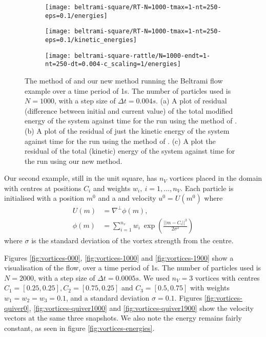 \documentclass[11pt, oneside]{article}   	%
\newcommand{\dt}{\Delta t}
\begin{document}
\begin{figure}[H]
   \begin{subfigure}[t]{0.4\textwidth}
        \centering
	\texttt{[image: beltrami-square/RT-N=1000-tmax=1-nt=250-eps=0.1/energies]}
        \caption{} \label{fig:beltrami-flow-energies-q}
    \end{subfigure}
    \begin{subfigure}[t]{0.4\textwidth}
        \centering
	\texttt{[image: beltrami-square/RT-N=1000-tmax=1-nt=250-eps=0.1/kinetic\_energies]}
        \caption{} \label{fig:beltrami-flow-energies-q-ke}
    \end{subfigure}
   \begin{subfigure}[t]{0.4\textwidth}
        \centering
	\texttt{[image: beltrami-square-rattle/N=1000-endt=1-nt=250-dt=0.004-c\_scaling=1/energies]}
        \caption{} \label{fig:beltrami-flow-energies}
    \end{subfigure}
\centering
\caption{The method of \cite{gallouet2016lagrangian} and our new method running the Beltrami flow example over a time period of 1s. The number of particles used is \(N = 1000\), with a step size of \(\dt = 0.004s\). (a) A plot of residual (difference between initial and current value) of the total modified energy of the system against time for the run using the method of \cite{gallouet2016lagrangian}. (b) A plot of the residual of just the kinetic energy of the system against time for the run using the method of \cite{gallouet2016lagrangian}. (c) A plot the residual of the total (kinetic) energy of the system against time for the run using our new method.}
\centering
\label{fig:beltrami-flow-energy}
\end{figure}
 
Our second example, still in the unit square, has \(n_V\) vortices placed in the domain with centres at positions \(C_i\) and weights \(w_i, \: i = 1,\dots,n_V\). Each particle is initialised with a position \(m^0\) and a and velocity \(u^0 = U(m^0)\) where
\begin{align}
U(m) &= \nabla^\perp \phi(m), \\
\phi(m) &= \sum_{i=1}^{n_v} w_i \: \exp(\frac{|| m - C_i ||^2}{2 \sigma^2})
\end{align}
where \(\sigma\) is the standard deviation of the vortex strength from the centre.

Figures \ref{fig:vortices-000}, \ref{fig:vortices-1000} and \ref{fig:vortices-1900} show a visualisation of the flow, over a time period of 1s. The number of particles used is \(N = 2000\), with a step size of \(\dt = 0.0005s\). We used \(n_V = 3\) vortices with centres \(C_1 = [0.25, 0.25], C_2 = [0.75, 0.25] \) and \(C_3 = [0.5, 0.75]\) with weights \(w_1 = w_2 = w_3 = 0.1\), and a standard deviation \(\sigma = 0.1\). Figures \ref{fig:vortices-quiver0}, \ref{fig:vortices-quiver1000} and \ref{fig:vortices-quiver1900}  show the velocity vectors at the same three snapshots. We also note the energy remains fairly constant, as seen in figure \ref{fig:vortices-energies}.
\end{document}
